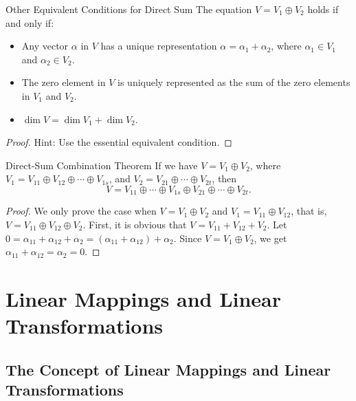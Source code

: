 \begin{proposition}{Other Equivalent Conditions for Direct Sum}{}
  The equation $V = V_1 \oplus V_2$ holds if and only if:
  \begin{itemize}
  \item Any vector $\alpha$ in $V$ has a unique representation $\alpha =
    \alpha_1 + \alpha_2$, where $\alpha_1 \in V_1$ and $\alpha_2 \in V_2$.
  \item The zero element in $V$ is uniquely represented as the sum of
    the zero elements in $V_1$ and $V_2$.
  \item $\operatorname{dim} V = \operatorname{dim} V_1 + \operatorname{dim} V_2$.
  \end{itemize}
\end{proposition}

\begin{proof}
  Hint: Use the essential equivalent condition.
\end{proof}

\begin{proposition}{Direct-Sum Combination Theorem}{}
  If we have $V = V_1 \oplus V_2$,
  where $V_1 = V_{11} \oplus V_{12} \oplus \cdots \oplus V_{1s}$,
  and $V_2 = V_{21} \oplus \cdots \oplus V_{2t}$,
  then
  \begin{equation}
    V = V_{11} \oplus \cdots \oplus V_{1s} \oplus V_{21} \oplus \cdots \oplus V_{2t}.
  \end{equation}
\end{proposition}

\begin{proof}
  We only prove the case when $V = V_1 \oplus V_2$ and $V_1 = V_{11} \oplus
  V_{12}$,
  that is, $V = V_{11} \oplus V_{12} \oplus V_2$.
  First, it is obvious that $V = V_{11} + V_{12} + V_2$.
  Let $0 = \alpha_{11} + \alpha_{12} + \alpha_2 = (\alpha_{11} + \alpha_{12}) + \alpha_2$.
  Since $V = V_1 \oplus V_2$,
  we get $\alpha_{11} + \alpha_{12} = \alpha_2 = 0$.
\end{proof}


\section{Linear Mappings and Linear Transformations}

\subsection{The Concept of Linear Mappings and Linear Transformations}

